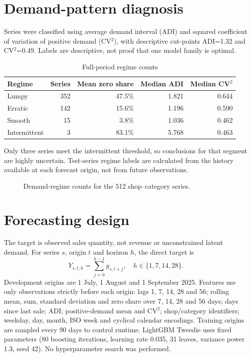 \documentclass[11pt,a4paper]{article}
\begin{document}
\section{Demand-pattern diagnosis}
Series were classified using average demand interval (ADI) and squared coefficient of variation of positive demand (CV$^2$), with descriptive cut-points ADI=1.32 and CV$^2$=0.49. Labels are descriptive, not proof that one model family is optimal.
\begin{table}[H]\centering\caption{Full-period regime counts}\begin{tabular}{lrrrr}\toprule
Regime & Series & Mean zero share & Median ADI & Median CV$^2$\\\midrule
Lumpy & 352 & 47.5\% & 1.821 & 0.644\\
Erratic & 142 & 15.6\% & 1.196 & 0.590\\
Smooth & 15 & 3.8\% & 1.036 & 0.462\\
Intermittent & 3 & 83.1\% & 5.768 & 0.463\\\bottomrule\end{tabular}\end{table}
Only three series meet the intermittent threshold, so conclusions for that segment are highly uncertain. Test-series regime labels are calculated from the history available at each forecast origin, not from future observations.

\begin{figure}[H]\centering
{}
\caption{Demand-regime counts for the 512 shop--category series.}
\end{figure}


\section{Forecasting design}
The target is observed sales quantity, not revenue or unconstrained latent demand. For series $s$, origin $t$ and horizon $h$, the direct target is
\[
Y_{s,t,h}=\sum_{j=0}^{h-1}y_{s,t+j},\quad h\in\{1,7,14,28\}.
\]
Development origins are 1 July, 1 August and 1 September 2025. Features use only observations strictly before each origin: lags 1, 7, 14, 28 and 56; rolling mean, sum, standard deviation and zero share over 7, 14, 28 and 56 days; days since last sale; ADI; positive-demand mean and CV$^2$; shop/category identifiers; weekday, day, month, ISO week and cyclical calendar encodings. Training origins are sampled every 90 days to control runtime. LightGBM Tweedie uses fixed parameters (80 boosting iterations, learning rate 0.035, 31 leaves, variance power 1.3, seed 42). No hyperparameter search was performed.
\end{document}

